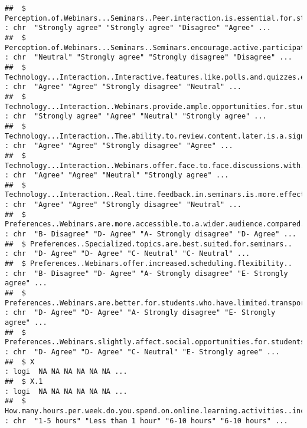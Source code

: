 \documentclass[
]{article}
\begin{document}
\begin{verbatim}
##  $ Perception.of.Webinars...Seminars..Peer.interaction.is.essential.for.student.learning.in.webinars..                    : chr  "Strongly agree" "Strongly agree" "Disagree" "Agree" ...
##  $ Perception.of.Webinars...Seminars..Seminars.encourage.active.participation.among.students..                            : chr  "Neutral" "Strongly agree" "Strongly disagree" "Disagree" ...
##  $ Technology...Interaction..Interactive.features.like.polls.and.quizzes.enhance.the.value.of.webinars.for.students..     : chr  "Agree" "Agree" "Strongly disagree" "Neutral" ...
##  $ Technology...Interaction..Webinars.provide.ample.opportunities.for.students.to.ask.questions..                         : chr  "Strongly agree" "Agree" "Neutral" "Strongly agree" ...
##  $ Technology...Interaction..The.ability.to.review.content.later.is.a.significant.advantage.of.webinars..                 : chr  "Agree" "Agree" "Strongly disagree" "Agree" ...
##  $ Technology...Interaction..Webinars.offer.face.to.face.discussions.with.instructors..                                   : chr  "Agree" "Agree" "Neutral" "Strongly agree" ...
##  $ Technology...Interaction..Real.time.feedback.in.seminars.is.more.effective.than.in.webinars..                          : chr  "Agree" "Agree" "Strongly disagree" "Neutral" ...
##  $ Preferences..Webinars.are.more.accessible.to.a.wider.audience.compared.to.seminars..                                   : chr  "B- Disagree" "D- Agree" "A- Strongly disagree" "D- Agree" ...
##  $ Preferences..Specialized.topics.are.best.suited.for.seminars..                                                         : chr  "D- Agree" "D- Agree" "C- Neutral" "C- Neutral" ...
##  $ Preferences..Webinars.offer.increased.scheduling.flexibility..                                                         : chr  "B- Disagree" "D- Agree" "A- Strongly disagree" "E- Strongly agree" ...
##  $ Preferences..Webinars.are.better.for.students.who.have.limited.transportation.options..                                : chr  "D- Agree" "D- Agree" "A- Strongly disagree" "E- Strongly agree" ...
##  $ Preferences..Webinars.slightly.affect.social.opportunities.for.students..                                              : chr  "D- Agree" "D- Agree" "C- Neutral" "E- Strongly agree" ...
##  $ X                                                                                                                      : logi  NA NA NA NA NA NA ...
##  $ X.1                                                                                                                    : logi  NA NA NA NA NA NA ...
##  $ How.many.hours.per.week.do.you.spend.on.online.learning.activities..including.webinars.and.seminars.                   : chr  "1-5 hours" "Less than 1 hour" "6-10 hours" "6-10 hours" ...
\end{verbatim}
\end{document}
